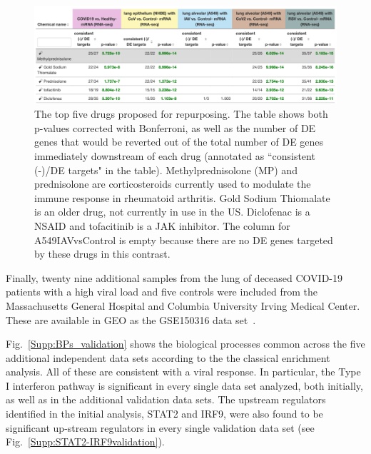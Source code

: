 \begin{figure}
\centering
	\includegraphics[width=1\linewidth]{../Figures/top5drugs.png}
    \caption{ The top five drugs proposed for repurposing. The table shows both p-values corrected with Bonferroni, as well as the number of DE genes that would be reverted out of the total number of  DE genes immediately downstream  of each drug (annotated as ``consistent (-)/DE targets" in the table).  Methylprednisolone (MP) and prednisolone are corticosteroids currently used to modulate the immune response in rheumatoid arthritis. Gold Sodium Thiomalate is an older drug, not currently in use in the US. Diclofenac is a NSAID and tofacitinib is a JAK inhibitor. The column for A549IAVvsControl is empty because there are no DE genes targeted by these drugs in this contrast.  }
        \label{top5drugs}
\end{figure} 

Finally, twenty nine additional samples from the lung of deceased COVID-19 patients with a high viral load and five controls were included from the Massachusetts General Hospital and Columbia University Irving Medical Center. These are available in GEO as the GSE150316 data set~\cite{desai2020temporal}.

 
Fig.~\ref{Supp:BPs_validation}  shows the biological processes common across the five additional independent data sets according to the the classical enrichment analysis. All of these are consistent with a viral response. In particular, the Type I interferon pathway is significant in every single data set analyzed, both initially, as well as in the additional validation data sets. The upstream regulators identified in the initial analysis, STAT2 and IRF9, were also found to be significant up-stream regulators in every single validation data set (see Fig.~\ref{Supp:STAT2-IRF9validation}).

